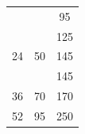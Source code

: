 \begin{table}[H]
\begin{tabular}{|c|c|c|}
                                                                                                                      &                                                                                                                                                      & 95                                                                                                                                 \\
                                                                                                                      &                                                                                                                                                      & 125                                                                                                                                \\
\multirow{-3}{*}{24}                                                                                                  & \multirow{-3}{*}{50}                                                                                                                                 & 145                                                                                                                                \\ \hline
                                                                                                                      &                                                                                                                                                      & 145                                                                                                                                \\
\multirow{-2}{*}{36}                                                                                                  & \multirow{-2}{*}{70}                                                                                                                                 & 170                                                                                                                                \\ \hline
52                                                                                                                    & 95                                                                                                                                                   & 250                                                                                                                                \\ \hline

\end{tabular}
\end{table}
